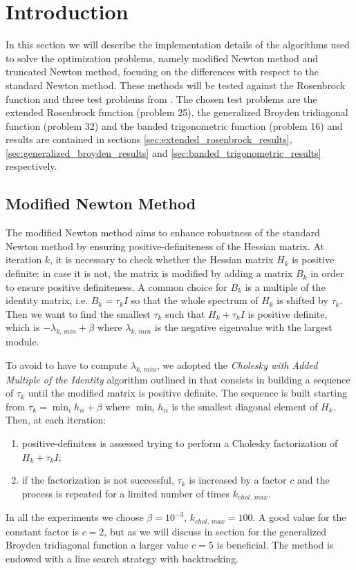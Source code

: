 \section{Introduction}
\label{sec:implementation_details}

In this section we will describe the implementation details of the algorithms used to solve the optimization problems, namely modified Newton method and truncated Newton method, focusing on the differences with respect to the standard Newton method.
These methods will be tested against the Rosenbrock function and three test problems from \cite{test-problems-unconstrained}.
The chosen test problems are the extended Rosenbrock function (problem 25), the generalized Broyden tridiagonal function (problem 32) and the banded trigonometric function (problem 16) and results are contained in sections \ref{sec:extended_rosenbrock_results}, \ref{sec:generalized_broyden_results} and \ref{sec:banded_trigonometric_results} respectively.

\subsection{Modified Newton Method}

The modified Newton method aims to enhance robustness of the standard Newton method by ensuring positive-definiteness of the Hessian matrix.
At iteration $k$, it is necessary to check whether the Hessian matrix $H_k$ is positive definite: in case it is not, the matrix is modified by adding a matrix $B_k$ in order to ensure positive definiteness.
A common choice for $B_k$ is a multiple of the identity matrix, i.e. $B_k = \tau_k I$ so that the whole spectrum of $H_k$ is shifted by $\tau_k$.
Then we want to find the smallest $\tau_k$ such that $H_k + \tau_k I$ is positive definite, which is $-\lambda_{k,\,min} + \beta$ where $\lambda_{k,\,min}$ is the negative eigenvalue with the largest module.

To avoid to have to compute $\lambda_{k,\,min}$, we adopted the \textit{Cholesky with Added Multiple of the Identity} algorithm outlined in \cite{nocedal-optimization} that consists in building a sequence of $\tau_k$ until the modified matrix is positive definite.
The sequence is built starting from $\tau_k = \min_i h_{ii} + \beta$ where $\min_i h_{ii}$ is the smallest diagonal element of $H_k$.
Then, at each iteration:
\begin{enumerate}
\item positive-definitess is assessed trying to perform a Cholesky factorization of $H_k + \tau_k I$;
\item if the factorization is not successful, $\tau_k$ is increased by a factor $c$ and the process is repeated for a limited number of times $k_{chol,\,max}$.
\end{enumerate}
In all the experiments we choose $\beta = 10^{-3}$,  $k_{chol,\,max} = 100$.
A good value for the constant factor is $c=2$, but as we will discuss in section  for the generalized Broyden tridiagonal function a larger value $c=5$ is beneficial.
The method is endowed with a line search strategy with backtracking.

